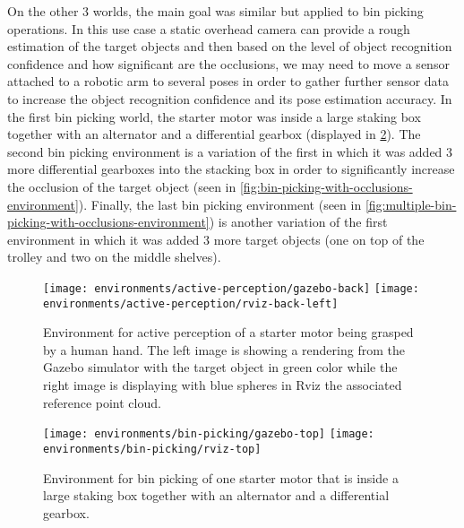 On the other 3 worlds, the main goal was similar but applied to bin picking operations. In this use case a static overhead camera can provide a rough estimation of the target objects and then based on the level of object recognition confidence and how significant are the occlusions, we may need to move a sensor attached to a robotic arm to several poses in order to gather further sensor data to increase the object recognition confidence and its pose estimation accuracy. In the first bin picking world, the starter motor was inside a large staking box together with an alternator and a differential gearbox (displayed in \cref{fig:bin-picking-environment}). The second bin picking environment is a variation of the first in which it was added 3 more differential gearboxes into the stacking box in order to significantly increase the occlusion of the target object (seen in \cref{fig:bin-picking-with-occlusions-environment}). Finally, the last bin picking environment (seen in \cref{fig:multiple-bin-picking-with-occlusions-environment}) is another variation of the first environment in which it was added 3 more target objects (one on top of the trolley and two on the middle shelves).

\begin{figure}[H]
	\centering
	\texttt{[image: environments/active-perception/gazebo-back]}
	\texttt{[image: environments/active-perception/rviz-back-left]}
	\caption{Environment for active perception of a starter motor being grasped by a human hand. The left image is showing a rendering from the Gazebo simulator with the target object in green color while the right image is displaying with blue spheres in Rviz the associated reference point cloud.}
	\label{fig:active-perception-environment}
\end{figure}

\begin{figure}[H]
	\centering
	\texttt{[image: environments/bin-picking/gazebo-top]}
	\texttt{[image: environments/bin-picking/rviz-top]}
	\caption{Environment for bin picking of one starter motor that is inside a large staking box together with an alternator and a differential gearbox.}
	\label{fig:bin-picking-environment}
\end{figure}

